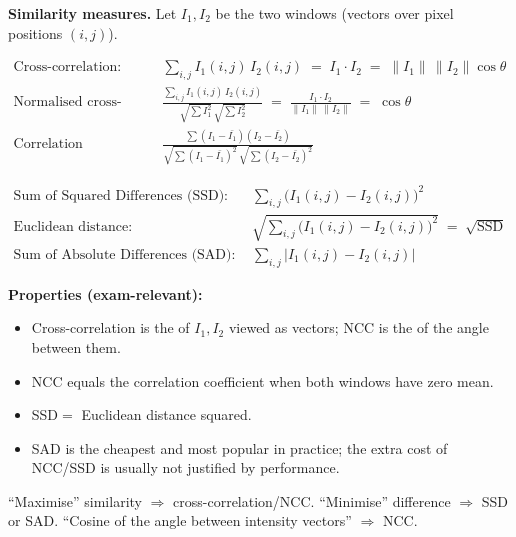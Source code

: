 \separator

\textbf{Similarity measures.} Let $I_1, I_2$ be the two windows (vectors over pixel positions $(i,j)$).

\begin{defbox}
\begin{align*}
\text{Cross-correlation:} \quad & \sum_{i,j} I_1(i,j)\, I_2(i,j) \;=\; I_1 \cdot I_2 \;=\; \|I_1\|\, \|I_2\| \cos\theta \\
\text{Normalised cross-correlation (NCC):} \quad & \frac{\sum_{i,j} I_1(i,j)\, I_2(i,j)}{\sqrt{\sum I_1^2}\, \sqrt{\sum I_2^2}} \;=\; \frac{I_1 \cdot I_2}{\|I_1\|\,\|I_2\|} \;=\; \cos\theta \\
\text{Correlation coefficient:} \quad & \frac{\sum (I_1 - \bar{I_1})(I_2 - \bar{I_2})}{\sqrt{\sum (I_1 - \bar{I_1})^2}\, \sqrt{\sum (I_2 - \bar{I_2})^2}}
\end{align*}
\end{defbox}

\begin{defbox}
\begin{align*}
\text{Sum of Squared Differences (SSD):} \quad & \sum_{i,j} \bigl(I_1(i,j) - I_2(i,j)\bigr)^2 \\
\text{Euclidean distance:} \quad & \sqrt{\textstyle\sum_{i,j} \bigl(I_1(i,j) - I_2(i,j)\bigr)^2} \;=\; \sqrt{\text{SSD}} \\
\text{Sum of Absolute Differences (SAD):} \quad & \sum_{i,j} |I_1(i,j) - I_2(i,j)|
\end{align*}
\end{defbox}

\textbf{Properties (exam-relevant):}
\begin{itemize}
  \item Cross-correlation is the  of $I_1, I_2$ viewed as vectors; NCC is the  of the angle between them.
  \item NCC equals the correlation coefficient when both windows have zero mean.
  \item SSD$=$ Euclidean distance squared.
  \item SAD is the cheapest and most popular in practice; the extra cost of NCC/SSD is usually not justified by performance.
\end{itemize}

\begin{tipbox}
``Maximise'' similarity $\Rightarrow$ cross-correlation/NCC. ``Minimise'' difference $\Rightarrow$ SSD or SAD. ``Cosine of the angle between intensity vectors'' $\Rightarrow$ NCC.
\end{tipbox}

